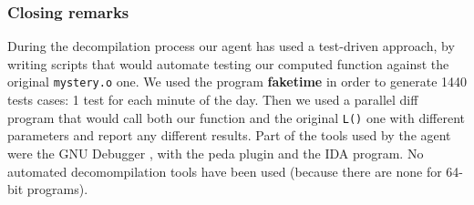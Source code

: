 \subsubsection{Closing remarks}
During the decompilation process our agent has used a test-driven approach, by writing scripts that would automate testing our computed function against the original \texttt{mystery.o} one. We used the program \textbf{faketime} in order to generate 1440 tests cases: 1 test for each minute of the day. Then we used a parallel diff program that would call both our function and the original \texttt{L()} one with different parameters and report any different results. Part of the tools used by the agent were the GNU Debugger , with the peda plugin and the IDA program. No automated decomompilation tools have been used (because there are none for 64-bit programs).
